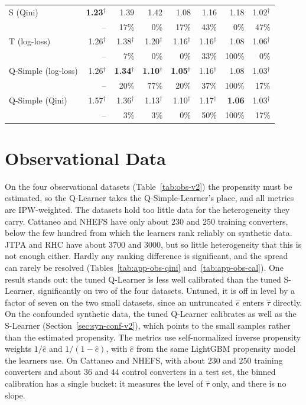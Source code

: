 \documentclass{article}
\begin{document}
\begin{table}[H]
\begin{tabular}{l|rrrrrrr}
S (Qini) & \textbf{1.23}$^\dagger$ & 1.39 & 1.42 & 1.08 & 1.16 & 1.18 & 1.02$^\dagger$ \\
 & \scriptsize -- & \scriptsize 17\% & \scriptsize 0\% & \scriptsize 17\% & \scriptsize 43\% & \scriptsize 0\% & \scriptsize 47\% \\[2pt]
T (log-loss) & 1.26$^\dagger$ & 1.38$^\dagger$ & 1.20$^\dagger$ & 1.16$^\dagger$ & 1.16$^\dagger$ & 1.08 & 1.06$^\dagger$ \\
 & \scriptsize -- & \scriptsize 7\% & \scriptsize 0\% & \scriptsize 0\% & \scriptsize 33\% & \scriptsize 100\% & \scriptsize 0\% \\[2pt]
Q-Simple (log-loss) & 1.26$^\dagger$ & \textbf{1.34}$^\dagger$ & \textbf{1.10}$^\dagger$ & \textbf{1.05}$^\dagger$ & 1.16$^\dagger$ & 1.08 & 1.03$^\dagger$ \\
 & \scriptsize -- & \scriptsize 20\% & \scriptsize 77\% & \scriptsize 20\% & \scriptsize 37\% & \scriptsize 100\% & \scriptsize 17\% \\[2pt]
Q-Simple (Qini) & 1.57$^\dagger$ & 1.36$^\dagger$ & 1.13$^\dagger$ & 1.10$^\dagger$ & 1.17$^\dagger$ & \textbf{1.06} & 1.03$^\dagger$ \\
 & \scriptsize -- & \scriptsize 3\% & \scriptsize 3\% & \scriptsize 0\% & \scriptsize 50\% & \scriptsize 100\% & \scriptsize 17\% \\[2pt]
\hline
\end{tabular}
\end{table}

\section{Observational Data}
\label{app:obs}
On the four observational datasets (Table~\ref{tab:obs-v2}) the propensity
must be estimated, so the Q-Learner takes the Q-Simple-Learner's place, and
all metrics are IPW-weighted. The datasets hold too little data for the
heterogeneity they carry. Cattaneo and NHEFS have only about $230$ and $250$
training converters, below the few hundred from which the learners rank
reliably on synthetic data. JTPA and RHC have about $3700$ and $3000$, but so
little heterogeneity that this is not enough either. Hardly any ranking
difference is significant, and the spread can rarely be resolved
(Tables~\ref{tab:app-obs-qini} and~\ref{tab:app-obs-cal}). One result stands
out: the tuned Q-Learner is less well calibrated than the tuned S-Learner,
significantly on two of the four datasets. Untuned, it is off in level by a
factor of seven on the two small datasets, since an untruncated $\hat e$
enters $\hat\tau$ directly. On the confounded synthetic data, the tuned
Q-Learner calibrates as well as the S-Learner
(Section~\ref{sec:syn-conf-v2}), which points to the small samples rather
than the estimated propensity. The metrics use self-normalized inverse
propensity weights $1/\hat e$ and $1/(1-\hat e)$, with $\hat e$ from the same
LightGBM propensity model the learners use. On Cattaneo and NHEFS, with about
$230$ and $250$ training converters and about $36$ and $44$ control converters
in a test set, the binned calibration has a single bucket: it measures the
level of $\hat\tau$ only, and there is no slope.
\end{document}
